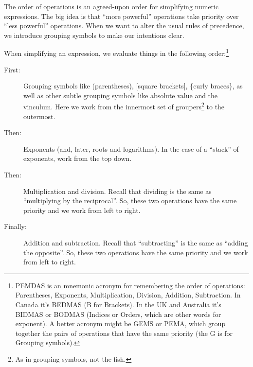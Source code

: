 \begin{boxeddef}
The \gls{order of operations} is an agreed-upon order for simplifying numeric expressions. The big idea is that ``more powerful'' operations take priority over ``less powerful'' operations. When we want to alter the usual rules of precedence, we introduce grouping symbols to make our intentions clear.

When simplifying an expression, we evaluate things in the following order:\footnote{PEMDAS is an mnemonic acronym for remembering the order of operations: Parentheses, Exponents, Multiplication, Division, Addition, Subtraction. In Canada it's BEDMAS (B for Brackets). In the UK and Australia it's BIDMAS or BODMAS (Indices or Orders, which are other words for exponent). A better acronym might be GEMS or PEMA, which group together the pairs of operations that have the same priority (the G is for Grouping symbols).}

\begin{description}
\item[First:] Grouping symbols like (parentheses), [square brackets], \{curly braces\}, as well as other subtle grouping symbols like absolute value and the vinculum. Here we work from the innermost set of groupers\footnote{As in grouping symbols, not the fish.} to the outermost.

\item[Then:] Exponents (and, later, roots and logarithms). In the case of a ``stack'' of exponents, work from the top down.

\item[Then:] Multiplication and division. Recall that dividing is the same as ``multiplying by the reciprocal''. So, these two operations have the same priority and we work from left to right.

\item[Finally:] Addition and subtraction. Recall that ``subtracting'' is the same as ``adding the opposite''. So, these two operations have the same priority and we work from left to right.
\end{description}
\end{boxeddef}

